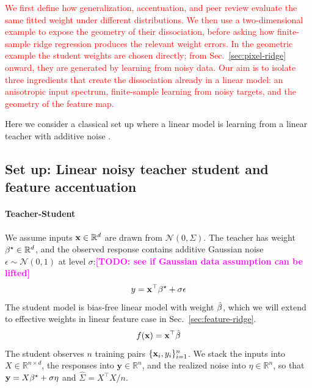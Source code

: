 \documentclass{article}
\newcommand{\red}[1]{\textcolor{red}{#1}}
\newcommand{\todo}[1]{\textcolor{magenta}{\textbf{[TODO: #1]}}}
\theoremstyle{plain}
\theoremstyle{definition}
\theoremstyle{remark}
\begin{document}
\red{We first define how generalization, accentuation, and peer review evaluate the same fitted weight under different distributions. We then use a two-dimensional example to expose the geometry of their dissociation, before asking how finite-sample ridge regression produces the relevant weight errors. In the geometric example the student weights are chosen directly; from Sec.~\ref{sec:pixel-ridge} onward, they are generated by learning from noisy data.}
\red{Our aim is to isolate three ingredients that create the dissociation already in a linear model: an anisotropic input spectrum, finite-sample learning from noisy targets, and the geometry of the feature map.}

Here we consider a classical set up where a linear model is learning from a linear teacher with additive noise \citep{dobriban2018high,hastie2022surprises}. %

\subsection{Set up: Linear noisy teacher student and feature accentuation}
\label{sec:linear-setup}

\paragraph{Teacher-Student}
We assume inputs $\mathbf{x}\in\mathbb{R}^d$ are drawn from $\mathcal{N}(0,\Sigma)$. The teacher has weight ${\beta^{\star}}\in\mathbb{R}^d$, and the observed response contains additive Gaussian noise $\epsilon\sim\mathcal{N}(0,1)$ at level $\sigma$:\todo{see if Gaussian data assumption can be lifted}
\[
y=\mathbf{x}^{\top}{\beta^{\star}}+\sigma\epsilon
\]
The student model is bias-free linear model with weight $\hat{\beta}$,
which we will extend to effective weights in linear feature case in Sec.~\ref{sec:feature-ridge}.
\[
f(\mathbf{x})=\mathbf{x}^{\top}\hat{\beta}
\]
The student observes $n$ training pairs $\{\mathbf{x}_i,y_i\}_{i=1}^n$. We stack the inputs into $X\in\mathbb{R}^{n\times d}$, the responses into $\mathbf y\in\mathbb{R}^n$, and the realized noise into $\eta\in\mathbb{R}^n$, so that $\mathbf y=X{\beta^{\star}}+\sigma\eta$ and $\hat\Sigma=X^\top X/n$.
\end{document}
